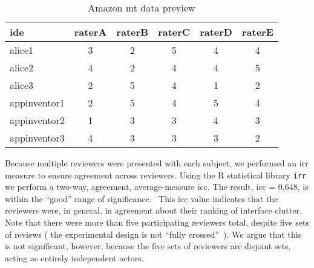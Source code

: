 \noindent
\begin{table}[!htb]\centering
{}
\begin{tabular}{@{}lccccc@{}}\toprule
  \textbf{\acs{ide}} & \textbf{raterA} & \textbf{raterB} &
  \textbf{raterC} & \textbf{raterD} & \textbf{raterE} \\
  \midrule
  alice1 & 3 & 2 & 5 & 4 & 4 \\
  alice2 & 4 & 2 & 4 & 4 & 5 \\
  alice3 & 2 & 5 & 4 & 1 & 2 \\
  appinventor1 & 2 & 5 & 4 & 5 & 4 \\
  appinventor2 & 1 & 3 & 3 & 4 & 3 \\
  appinventor3 & 4 & 3 & 3 & 3 & 2 \\
  \bottomrule
\end{tabular}
\caption{Amazon \acs{mt} data preview}
\label{table:mturk_data}
\end{table}

Because multiple reviewers were presented with each subject, we performed
an \ac{irr} measure to ensure agreement across reviewers. Using the R
statistical library \texttt{irr} we perform a two-way, agreement,
average-measure \ac{icc}. The result, \ac{icc} = 0.648, is within the
``good'' range of significance.~\cite{cicchetti1994,hallgren2012} This
\ac{icc} value indicates that the reviewers were, in general, in agreement
about their ranking of interface clutter. Note that there were more than
five participating reviewers total, despite five sets of reviews (\ie{} the
experimental design is not ``fully crossed''~\cite{hallgren2012}). We argue
that this is not significant, however, because the five sets of reviewers
are disjoint sets, acting as entirely independent actors.
